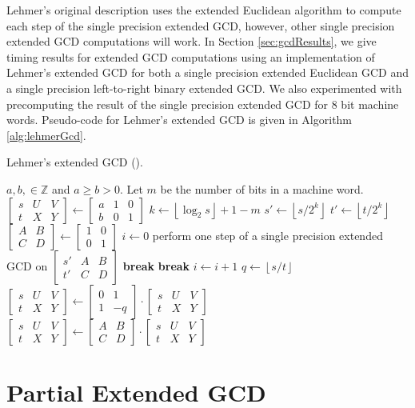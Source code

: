 \documentclass{ucalgthes1}
\theoremstyle{definition}
\newcommand{\ZZ}{\mathbb{Z}}
\newcommand{\matrixtt}[4]{\left[ \begin{array}{rr} #1 & #2 \\ #3 & #4 \end{array} \right]}
\newcommand{\matrixThreeTwo}[6]{\left[ \begin{array}{rrr} #1 & #2 & #3 \\ #4 & #5 & #6 \end{array} \right]}
\newcommand{\floor}[1]{\left\lfloor #1 \right\rfloor}
\begin{document}
Lehmer's original description \cite{Lehmer1938} uses the extended Euclidean algorithm to compute each step of the single precision extended GCD, however, other single precision extended GCD computations will work.  In Section \ref{sec:gcdResults}, we give timing results for extended GCD computations using an implementation of Lehmer's extended GCD for both a single precision extended Euclidean GCD and a single precision left-to-right binary extended GCD.  We also experimented with precomputing the result of the single precision extended GCD for 8 bit machine words.  Pseudo-code for Lehmer's extended GCD is given in Algorithm \ref{alg:lehmerGcd}.


\begin{algorithm}[htb]
\caption{Lehmer's extended GCD (\cite{Lehmer1938}).}
\label{alg:lehmerGcd}
\begin{algorithmic}[1]
\Require $a,b, \in \ZZ$ and $a \ge b > 0$. Let $m$ be the number of bits in a machine word.
\State $\matrixThreeTwo{s}{U}{V}{t}{X}{Y} \gets \matrixThreeTwo{a}{1}{0}{b}{0}{1}$
	\State $k \gets \floor{\log_2 s} + 1 - m$
	\State $s' \gets \floor{s / 2^k}$ 
	\State $t' \gets \floor{t / 2^k}$
	\State $\matrixtt{A}{B}{C}{D} \gets \matrixtt{1}{0}{0}{1}$
	\State $i \gets 0$
		\State perform one step of a single precision extended GCD on $\matrixThreeTwo{s'}{A}{B}{t'}{C}{D}$
			 \textbf{break} \EndIf
		\Else {} \textbf{break} \EndIf
		\EndIf
		\State $i \gets i + 1$
	\EndWhile
		\State $q \gets \floor{s/t}$  
		\State $\matrixThreeTwo{s}{U}{V}{t}{X}{Y} \gets \matrixtt{0}{1}{1}{-q}
		        \cdot \matrixThreeTwo{s}{U}{V}{t}{X}{Y}$
	\Else
		\State $\matrixThreeTwo{s}{U}{V}{t}{X}{Y} \gets \matrixtt{A}{B}{C}{D}
		        \cdot \matrixThreeTwo{s}{U}{V}{t}{X}{Y}$ 
	\EndIf
\EndWhile
\end{algorithmic}
\end{algorithm}


\section{Partial Extended GCD}
\label{sec:gcdPartial}
\end{document}
